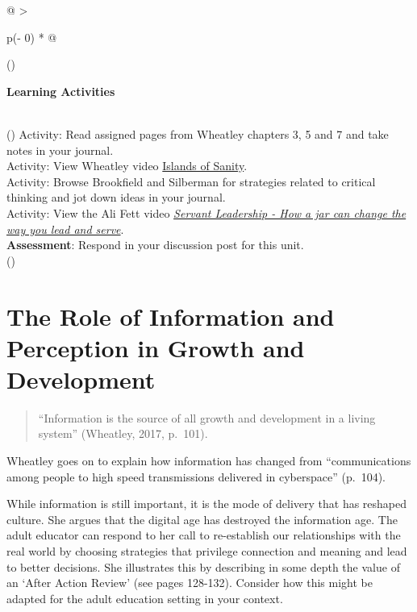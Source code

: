 \documentclass[
]{book}
\begin{document}
\begin{longtable}[]{@{}
  >{\raggedright\arraybackslash}p{(\columnwidth - 0\tabcolsep) * }@{}}
\toprule()
\begin{minipage}[b]{\linewidth}\raggedright
\textbf{Learning Activities}
\end{minipage} \\
\midrule()
\endhead
Activity: Read assigned pages from Wheatley chapters 3, 5 and 7 and take notes in your journal. \\
Activity: View Wheatley video \href{https://youtu.be/LtaYNxp56gs}{Islands of Sanity}. \\
Activity: Browse Brookfield and Silberman for strategies related to critical thinking and jot down ideas in your journal. \\
Activity: View the Ali Fett video \href{https://youtu.be/1vIPrR_clEg}{\emph{Servant Leadership - How a jar can change the way you lead and serve}}. \\
\textbf{Assessment}: Respond in your discussion post for this unit. \\
\bottomrule()
\end{longtable}

\hypertarget{the-role-of-information-and-perception-in-growth-and-development}{%
\section{The Role of Information and Perception in Growth and Development}\label{the-role-of-information-and-perception-in-growth-and-development}}

\begin{quote}
``Information is the source of all growth and development in a living system'' (Wheatley, 2017, p.~101).
\end{quote}

Wheatley goes on to explain how information has changed from ``communications among people to high speed transmissions delivered in cyberspace'' (p.~104).

While information is still important, it is the mode of delivery that has reshaped culture. She argues that the digital age has destroyed the information age. The adult educator can respond to her call to re-establish our relationships with the real world by choosing strategies that privilege connection and meaning and lead to better decisions. She illustrates this by describing in some depth the value of an `After Action Review' (see pages 128-132). Consider how this might be adapted for the adult education setting in your context.
\end{document}
